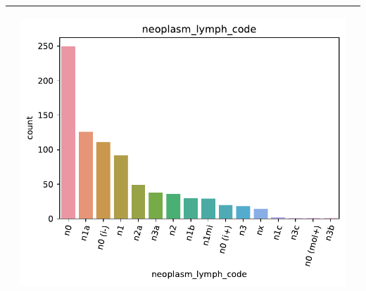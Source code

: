 \begin{table}[!htb]
\begin{threeparttable}
\begin{tabular}{p{2.5cm} p{7cm} p{6.5cm}}
			& \begin{center}\includegraphics[width=1\linewidth]{NOTEBOOK/IMAGENES_DESCRIPTIVAS/3_neoplasm_lymph_code}\end{center}
			\\ \hline
		\end{tabular}
	\end{threeparttable}
\end{table}

